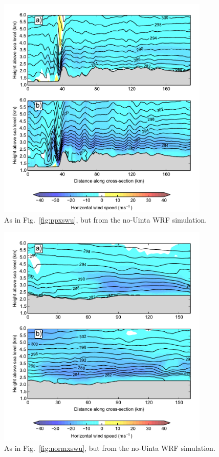 \documentclass[pdftex,12pt]{article}
\begin{document}
\begin{figure}[p]
   \centering
\includegraphics[width=0.9\textwidth]{no_xs_westeast_parawind.pdf}
   \caption{As in Fig.~\ref{fig:ppxswu}, but from the no-Uinta WRF simulation.}
   \label{fig:ppxsnu}
\end{figure}

\begin{figure}[p]
   \centering
\includegraphics[width=0.9\textwidth]{no_xs_northsouth_perpwind.pdf}
   \caption{As in Fig.~\ref{fig:normxswu}, but from the no-Uinta WRF simulation.}
   \label{fig:normxsnu}
\end{figure}
\end{document}
